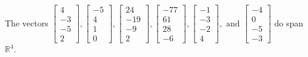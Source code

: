 \begin{exercise}
\begin{exerciseStatement}
  \end{exerciseStatement}
  \begin{exerciseAnswer}
   The vectors \(\left[\begin{array}{r}
4 \\
-3 \\
-5 \\
2
\end{array}\right] , \left[\begin{array}{r}
-5 \\
4 \\
1 \\
0
\end{array}\right] , \left[\begin{array}{r}
24 \\
-19 \\
-9 \\
2
\end{array}\right] , \left[\begin{array}{r}
-77 \\
61 \\
28 \\
-6
\end{array}\right] , \left[\begin{array}{r}
-1 \\
-3 \\
-2 \\
4
\end{array}\right] , \text{ and } \left[\begin{array}{r}
-4 \\
0 \\
-5 \\
-3
\end{array}\right]\) 
  	 do  
	span \(\mathbb{R}^4\).
  


  \end{exerciseAnswer}
\end{exercise}